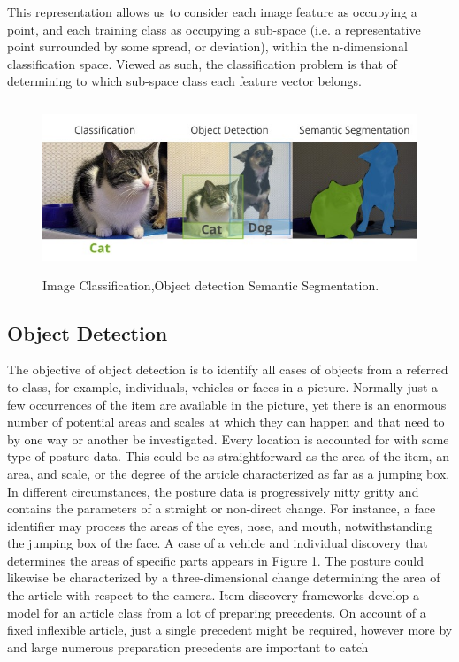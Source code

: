  This representation allows us to consider each image feature as occupying a point, and each training class as occupying a sub-space (i.e. a representative point surrounded by some spread, or deviation), within the n-dimensional classification space. Viewed as such, the classification problem is that of determining to which sub-space class each feature vector belongs.
\begin{figure}[H]
  \centering
  \includegraphics[height=2in]{images/classification_detection_segmentaion_comparisons.jpeg}
   \caption{Image Classification,Object detection Semantic Segmentation.}
\end{figure}
\subsection{Object Detection}
 The objective of object detection is to identify all cases of objects from a referred to class, for example, individuals, vehicles or faces in a picture. Normally just a few occurrences of the item are available in the picture, yet there is an enormous number of potential areas and scales at which they can happen and that need to by one way or another be investigated. 
 Every location is accounted for with some type of posture data. This could be as straightforward as the area of the item, an area, and scale, or the degree of the article characterized as far as a jumping box. In different circumstances, the posture data is progressively nitty gritty and contains the parameters of a straight or non-direct change. For instance, a face identifier may process the areas of the 
 eyes, nose, and mouth, notwithstanding the jumping box of the face. A case of a vehicle and individual discovery that determines the areas of specific parts appears in Figure 1. The posture could likewise be characterized by a three-dimensional change determining the area of the article with respect to the camera. 
 Item discovery frameworks develop a model for an article class from a lot of 
 preparing precedents. On account of a fixed inflexible article, just a single precedent might be 
 required, however more by and large numerous preparation precedents are important to catch 
 
